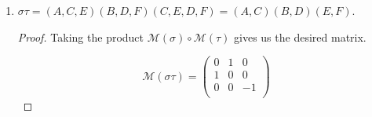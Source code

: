 \documentclass[../psets.tex]{subfiles}
\begin{document}
\begin{enumerate}
\begin{enumerate}
\begin{proof}
\begin{equation*}
{                    \begin{pmatrix}
                        1 & 0 & 0\\
                        0 & 0 & -1\\
                        0 & 1 & 0\\
                    \end{pmatrix}
                }
            \end{equation*}
        \end{proof}
        \item $\sigma\tau=(A,C,E)(B,D,F)(C,E,D,F)=(A,C)(B,D)(E,F)$.
        \begin{proof}
            Taking the product $\mathcal{M}(\sigma)\circ\mathcal{M}(\tau)$ gives us the desired matrix.
            
            \begin{equation*}
                \boxed{\mathcal{M}(\sigma\tau) =
                    \begin{pmatrix}
                        0 & 1 & 0\\
                        1 & 0 & 0\\
                        0 & 0 & -1\\
                    \end{pmatrix}
                }
            \end{equation*}
        \end{proof}
    \end{enumerate}
\end{enumerate}
\end{document}
